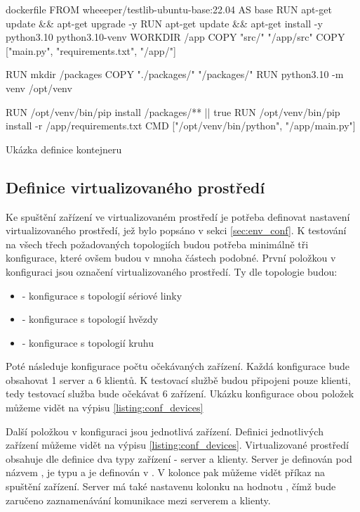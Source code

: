 \begin{listing}[htbp]
    \centering
    \begin{cminted}[breaklines,autogobble, fontsize=\footnotesize]{dockerfile}
FROM wheeeper/testlib-ubuntu-base:22.04 AS base
RUN apt-get update && apt-get upgrade -y
RUN apt-get update && apt-get install -y python3.10 python3.10-venv
WORKDIR /app
COPY "src/" "/app/src"
COPY ["main.py", "requirements.txt", "/app/"]

RUN mkdir /packages
COPY "./packages/" "/packages/"
RUN python3.10 -m venv /opt/venv

RUN /opt/venv/bin/pip install  /packages/** || true
RUN /opt/venv/bin/pip install -r /app/requirements.txt 
CMD ["/opt/venv/bin/python", "/app/main.py"]
    \end{cminted}
\caption{Ukázka definice kontejneru}
\label{listing:dockerfile}
\end{listing}

\subsection{Definice virtualizovaného prostředí}

Ke spuštění zařízení ve virtualizovaném prostředí je potřeba definovat nastavení virtualizovaného prostředí, jež bylo popsáno v sekci \ref{sec:env_conf}. K testování na všech třech požadovaných topologiích budou potřeba minimálně tři konfigurace, které ovšem budou v mnoha částech podobné. První položkou v konfiguraci jsou označení virtualizovaného prostředí. Ty dle topologie budou:

\begin{itemize}
    \item {} - konfigurace s topologií sériové linky
    \item {} - konfigurace s topologií hvězdy
    \item {} - konfigurace s topologií kruhu
\end{itemize}

Poté následuje konfigurace počtu očekávaných zařízení. Každá konfigurace bude obsahovat 1 server a 6 klientů. K testovací službě budou připojeni pouze klienti, tedy testovací služba bude očekávat 6 zařízení. Ukázku konfigurace obou položek můžeme vidět na výpisu \ref{listing:conf_devices}

Další položkou v konfiguraci jsou jednotlivá zařízení. Definici jednotlivých zařízení můžeme vidět na výpisu \ref{listing:conf_devices}. Virtualizované prostředí obsahuje dle definice dva typy zařízení - server a klienty. Server je definován pod názvem , je typu  a je definován v . V kolonce  pak můžeme vidět příkaz na spuštění zařízení. Server má také nastavenu kolonku  na hodnotu , čímž bude zaručeno zaznamenávání komunikace mezi serverem a klienty.

